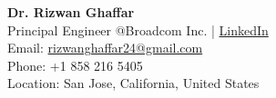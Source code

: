 \documentclass[a4paper,12pt]{article}
\begin{document}
\vspace{1em}

\textbf{Dr. Rizwan Ghaffar} \\
Principal Engineer @Broadcom Inc. | \href{https://www.linkedin.com/in/rizwan-ghaffar/}{LinkedIn} \\
Email: \href{mailto:rizwanghaffar24@gmail.com}{rizwanghaffar24@gmail.com} \\
Phone: +1 858 216 5405 \\
Location: San Jose, California, United States


\vfill
\end{document}
